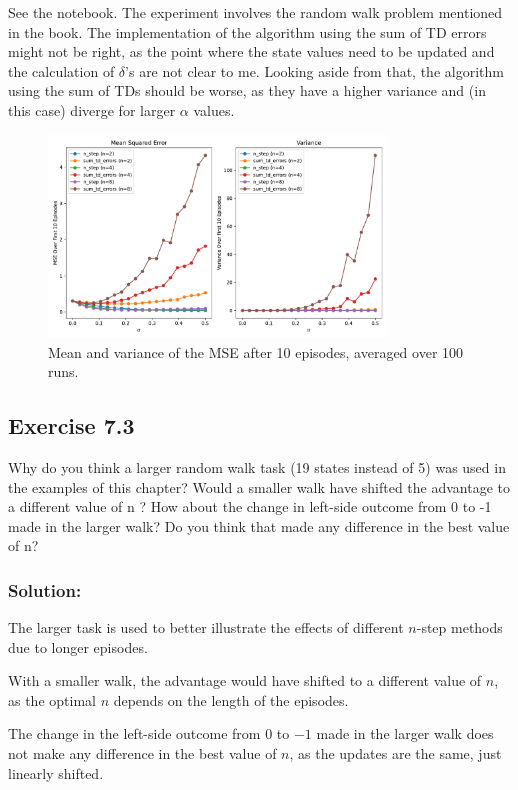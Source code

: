 See the notebook.
The experiment involves the random walk problem mentioned in the book. The implementation of the algorithm using the sum of TD errors might not be right, as the point where the state values need to be updated and the calculation of $\delta$'s are not clear to me.
Looking aside from that, the algorithm using the sum of TDs should be worse, as they have a higher variance and (in this case) diverge for larger $\alpha$ values.
\begin{figure}[H]
    \centering
    \includegraphics[width=0.8\textwidth]{chapters_latex/figures/ex_07_02.pdf}
    \captionsetup{labelformat=empty}
    \caption{Mean and variance of the MSE after 10 episodes, averaged over 100 runs.}
\end{figure}

\subsection*{Exercise 7.3}
Why do you think a larger random walk task (19 states instead of 5) was
used in the examples of this chapter? Would a smaller walk have shifted the advantage
to a different value of n ? How about the change in left-side outcome from 0 to -1 made
in the larger walk? Do you think that made any difference in the best value of n?

\subsubsection*{Solution:}
The larger task is used to better illustrate the effects of different $n$-step methods due to longer episodes.

With a smaller walk, the advantage would have shifted to a different value of $n$, as the optimal $n$ depends on the length of the episodes.

The change in the left-side outcome from 0 to $-1$ made in the larger walk does not make any difference in the best value of $n$, as the updates are the same, just linearly shifted.

